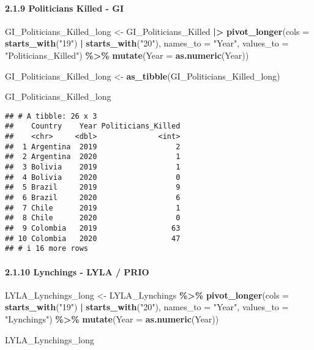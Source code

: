 \documentclass[
  11pt,
]{article}
\newenvironment{Shaded}{\begin{snugshade}}{\end{snugshade}}
\newcommand{\AttributeTok}[1]{\textcolor[rgb]{0.13,0.29,0.53}{#1}}
\newcommand{\FunctionTok}[1]{\textcolor[rgb]{0.13,0.29,0.53}{\textbf{#1}}}
\newcommand{\NormalTok}[1]{#1}
\newcommand{\OtherTok}[1]{\textcolor[rgb]{0.56,0.35,0.01}{#1}}
\newcommand{\SpecialCharTok}[1]{\textcolor[rgb]{0.81,0.36,0.00}{\textbf{#1}}}
\newcommand{\StringTok}[1]{\textcolor[rgb]{0.31,0.60,0.02}{#1}}
\begin{document}
\paragraph{2.1.9 Politicians Killed -
GI}\label{politicians-killed---gi-1}

\begin{Shaded}
\begin{Highlighting}[]
\NormalTok{GI\_Politicians\_Killed\_long }\OtherTok{\textless{}{-}}\NormalTok{ GI\_Politicians\_Killed }\SpecialCharTok{|\textgreater{}}
  \FunctionTok{pivot\_longer}\NormalTok{(}\AttributeTok{cols =} \FunctionTok{starts\_with}\NormalTok{(}\StringTok{"19"}\NormalTok{) }\SpecialCharTok{|} \FunctionTok{starts\_with}\NormalTok{(}\StringTok{"20"}\NormalTok{), }
               \AttributeTok{names\_to =} \StringTok{"Year"}\NormalTok{, }\AttributeTok{values\_to =} \StringTok{"Politicians\_Killed"}\NormalTok{) }\SpecialCharTok{\%\textgreater{}\%}
  \FunctionTok{mutate}\NormalTok{(}\AttributeTok{Year =} \FunctionTok{as.numeric}\NormalTok{(Year))}

\NormalTok{GI\_Politicians\_Killed\_long }\OtherTok{\textless{}{-}} \FunctionTok{as\_tibble}\NormalTok{(GI\_Politicians\_Killed\_long)}

\NormalTok{GI\_Politicians\_Killed\_long}
\end{Highlighting}
\end{Shaded}

\begin{verbatim}
## # A tibble: 26 x 3
##    Country    Year Politicians_Killed
##    <chr>     <dbl>              <int>
##  1 Argentina  2019                  2
##  2 Argentina  2020                  1
##  3 Bolivia    2019                  1
##  4 Bolivia    2020                  0
##  5 Brazil     2019                  9
##  6 Brazil     2020                  6
##  7 Chile      2019                  1
##  8 Chile      2020                  0
##  9 Colombia   2019                 63
## 10 Colombia   2020                 47
## # i 16 more rows
\end{verbatim}

\paragraph{2.1.10 Lynchings - LYLA /
PRIO}\label{lynchings---lyla-prio-1}

\begin{Shaded}
\begin{Highlighting}[]
\NormalTok{LYLA\_Lynchings\_long }\OtherTok{\textless{}{-}}\NormalTok{ LYLA\_Lynchings }\SpecialCharTok{\%\textgreater{}\%}
  \FunctionTok{pivot\_longer}\NormalTok{(}\AttributeTok{cols =} \FunctionTok{starts\_with}\NormalTok{(}\StringTok{"19"}\NormalTok{) }\SpecialCharTok{|} \FunctionTok{starts\_with}\NormalTok{(}\StringTok{"20"}\NormalTok{), }
               \AttributeTok{names\_to =} \StringTok{"Year"}\NormalTok{, }\AttributeTok{values\_to =} \StringTok{"Lynchings"}\NormalTok{) }\SpecialCharTok{\%\textgreater{}\%}
  \FunctionTok{mutate}\NormalTok{(}\AttributeTok{Year =} \FunctionTok{as.numeric}\NormalTok{(Year))}

\NormalTok{LYLA\_Lynchings\_long}
\end{Highlighting}
\end{Shaded}
\end{document}
